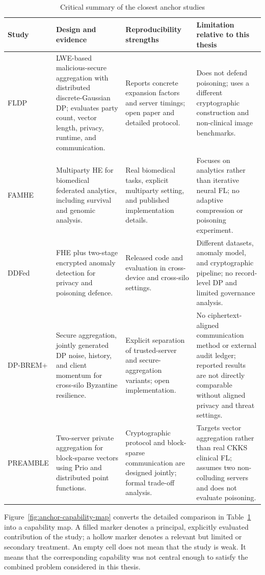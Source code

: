 \begin{table}[htbp]
\centering
\caption{Critical summary of the closest anchor studies}
\label{tab:anchor-studies}
\small
\begin{tabularx}{\textwidth}{@{}p{2.15cm}p{2.55cm}X X@{}}
\toprule
Study & Design and evidence & Reproducibility strengths & Limitation relative to this thesis \\
\midrule
FLDP \cite{stevens2022fldp} & LWE-based malicious-secure aggregation with distributed discrete-Gaussian DP; evaluates party count, vector length, privacy, runtime, and communication. & Reports concrete expansion factors and server timings; open paper and detailed protocol. & Does not defend poisoning; uses a different cryptographic construction and non-clinical image benchmarks. \\
FAMHE \cite{froelicher2021famh} & Multiparty HE for biomedical federated analytics, including survival and genomic analysis. & Real biomedical tasks, explicit multiparty setting, and published implementation details. & Focuses on analytics rather than iterative neural FL; no adaptive compression or poisoning experiment. \\
DDFed \cite{xu2024ddfed} & FHE plus two-stage encrypted anomaly detection for privacy and poisoning defence. & Released code and evaluation in cross-device and cross-silo settings. & Different datasets, anomaly model, and cryptographic pipeline; no record-level DP and limited governance analysis. \\
DP-BREM+ \cite{gu2025dpbrem} & Secure aggregation, jointly generated DP noise, history, and client momentum for cross-silo Byzantine resilience. & Explicit separation of trusted-server and secure-aggregation variants; open implementation. & No ciphertext-aligned communication method or external audit ledger; reported results are not directly comparable without aligned privacy and threat settings. \\
PREAMBLE \cite{asi2025preamble} & Two-server private aggregation for block-sparse vectors using Prio and distributed point functions. & Cryptographic protocol and block-sparse communication are designed jointly; formal trade-off analysis. & Targets vector aggregation rather than real CKKS clinical FL; assumes two non-colluding servers and does not evaluate poisoning. \\
\bottomrule
\end{tabularx}
\end{table}

Figure~\ref{fig:anchor-capability-map} converts the detailed comparison in Table~\ref{tab:anchor-studies} into a capability map. A filled marker denotes a principal, explicitly evaluated contribution of the study; a hollow marker denotes a relevant but limited or secondary treatment. An empty cell does not mean that the study is weak. It means that the corresponding capability was not central enough to satisfy the combined problem considered in this thesis.

